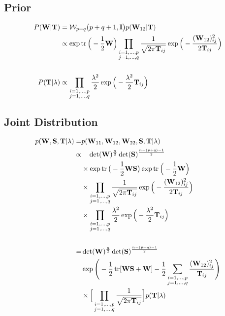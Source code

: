 \subsection{Prior}
\begin{align*}
P(\mathbf{W}|\mathbf{T}) &=
\mathcal{W}_{p+q} \big(p + q + 1, \mathbf{I}\big) p(\mathbf{W}_{12} | \mathbf{T} )
\\
&\propto \exp\operatorname{tr} \Big(-\frac{1}{2} \mathbf{W}\Big)
\prod_{{\substack{i=1,\dots,p\\j=1,\dots,q}} }   \frac{1}{\sqrt{2\pi \mathbf{T}_{ij}}} \exp 
\Big( - \frac{(\mathbf{W}_{12})_{ij}^2}{2\mathbf{T}_{ij}} \Big) 
\\ \\
P(\mathbf{T}| \lambda) &\propto
\prod_{{\substack{i=1,\dots,p\\j=1,\dots,q}} }   \frac{\lambda^2}{2} \exp \Big( - \frac{\lambda^2}{2} \mathbf{T}_{ij} \Big)
\end{align*}
\subsection{Joint Distribution}
\begin{align*}
p(\mathbf{W}, \mathbf{S}, \mathbf{T} | \lambda) =& p(\mathbf{W}_{11}, \mathbf{W}_{12}, \mathbf{W}_{22}, \mathbf{S}, \mathbf{T} | \lambda) \\
\propto& \quad \det(\mathbf{W})^\frac{n}{2} 
\det(\mathbf{S})^{\frac{n-(p+q)-1}{2} }
\\
&\times \exp \operatorname{tr} \big( - \frac{1}{2} \mathbf{W} \mathbf{S}\big)		
 \exp\operatorname{tr} \Big(-\frac{1}{2} \mathbf{W}\Big)
\\
&\times \prod_{{\substack{i=1,\dots,p\\j=1,\dots,q}} }  \frac{1}{\sqrt{2\pi \mathbf{T}_{ij}}} \exp 
\Big( - \frac{(\mathbf{W}_{12})_{ij}^2}{2\mathbf{T}_{ij}} \Big) 
\\
&\times \prod_{{\substack{i=1,\dots,p\\j=1,\dots,q}} } \frac{\lambda^2}{2} \exp \Big( - \frac{\lambda^2}{2} \mathbf{T}_{ij} \Big)
\\\\
= &\det(\mathbf{W})^{\frac{n}{2}}  \det(\mathbf{S})^{\frac{n-(p+q)-1}{2}} 
\\
&\exp\Bigg(-\frac{1}{2} \operatorname{tr} [\mathbf{WS}+\mathbf{W}] - \frac{1}{2} \sum_{{\substack{i=1,\dots,p\\j=1,\dots,q}} } \frac{(\mathbf{W}_{12})_{ij}^2}{\mathbf{T}_{ij}}  \Bigg) 
\\
&\times \Big[\prod_{{\substack{i=1,\dots,p\\j=1,\dots,q}} }  \frac{1}{\sqrt{2\pi \mathbf{T}_{ij}}}\Big]
p(\mathbf{T}|\lambda)
\end{align*}
